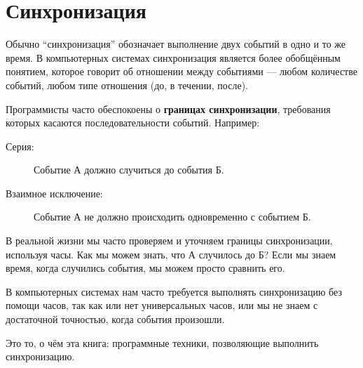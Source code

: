 \section{Синхронизация}
\label{synch}

Обычно ``синхронизация'' обозначает выполнение двух событий
в одно и то же время.
В компьютерных системах синхронизация является более обобщённым понятием,
которое говорит об отношении между событиями --- 
любом количестве событий, любом типе отношения (до, в течении, после).

Программисты часто обеспокоены о {\bf границах синхронизации},
требования которых касаются последовательности событий.
Например:

\begin{description}

\item[Серия:] Событие А должно случиться до события Б.

\item[Взаимное исключение:] Событие А не должно происходить одновременно с
событием Б.

\end{description}

В реальной жизни мы часто проверяем и уточняем границы синхронизации,
используя часы.
Как мы можем знать, что А случилось до Б?
Если мы знаем время, когда случились события, мы можем просто сравнить его.

В компьютерных системах нам часто требуется выполнять синхронизацию
без помощи часов, так как или нет универсальных часов,
или мы не знаем с достаточной точностью, когда события произошли.

Это то, о чём эта книга: программные техники, позволяющие выполнить
синхронизацию.
